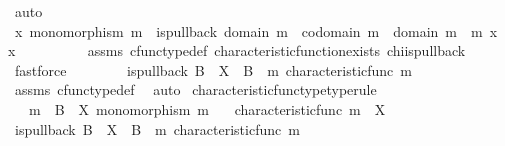 \begin{isabellebody}
\ auto\isanewline
\ \ \ \ \isamarkupfalse%
\ {\isachardoublequoteopen}{\isasymAnd}x{\isachardot}{\kern0pt}\ monomorphism\ m\ {\isasymlongrightarrow}\ is{\isacharunderscore}{\kern0pt}pullback\ {\isacharparenleft}{\kern0pt}domain\ m{\isacharparenright}{\kern0pt}\ {\isasymone}\ {\isacharparenleft}{\kern0pt}codomain\ m{\isacharparenright}{\kern0pt}\ {\isasymOmega}\ {\isacharparenleft}{\kern0pt}{\isasymbeta}\isactrlbsub domain\ m\isactrlesub {\isacharparenright}{\kern0pt}\ {\isasymt}\ m\ x\ {\isasymLongrightarrow}\ x\ {\isacharequal}{\kern0pt}\ {\isasymchi}{\isachardoublequoteclose}\isanewline
\ \ \ \ \ \ \isamarkupfalse%
\ assms\ cfunc{\isacharunderscore}{\kern0pt}type{\isacharunderscore}{\kern0pt}def\ characteristic{\isacharunderscore}{\kern0pt}function{\isacharunderscore}{\kern0pt}exists\ chi{\isacharunderscore}{\kern0pt}is{\isacharunderscore}{\kern0pt}pullback\ \isamarkupfalse%
\ fastforce\isanewline
\ \ \isamarkupfalse%
\isanewline
\ \ \isamarkupfalse%
\ \isamarkupfalse%
\ {\isachardoublequoteopen}is{\isacharunderscore}{\kern0pt}pullback\ B\ {\isasymone}\ X\ {\isasymOmega}\ {\isacharparenleft}{\kern0pt}{\isasymbeta}\isactrlbsub B\isactrlesub {\isacharparenright}{\kern0pt}\ {\isasymt}\ m\ {\isacharparenleft}{\kern0pt}characteristic{\isacharunderscore}{\kern0pt}func\ m{\isacharparenright}{\kern0pt}{\isachardoublequoteclose}\isanewline
\ \ \ \ \isamarkupfalse%
\ assms\ cfunc{\isacharunderscore}{\kern0pt}type{\isacharunderscore}{\kern0pt}def\ \isamarkupfalse%
\ auto\isanewline
{}\isamarkupfalse%
%
\endisatagproof
{\isafoldproof}%
%
\isadelimproof
\isanewline
%
\endisadelimproof
\isanewline
{}\isamarkupfalse%
\ characteristic{\isacharunderscore}{\kern0pt}func{\isacharunderscore}{\kern0pt}type{\isacharbrackleft}{\kern0pt}type{\isacharunderscore}{\kern0pt}rule{\isacharbrackright}{\kern0pt}{\isacharcolon}{\kern0pt}\isanewline
\ \ \ {\isachardoublequoteopen}m\ {\isacharcolon}{\kern0pt}\ B\ {\isasymrightarrow}\ X{\isachardoublequoteclose}\ {\isachardoublequoteopen}monomorphism\ m{\isachardoublequoteclose}\isanewline
\ \ \ {\isachardoublequoteopen}characteristic{\isacharunderscore}{\kern0pt}func\ m\ {\isacharcolon}{\kern0pt}\ X\ {\isasymrightarrow}\ {\isasymOmega}{\isachardoublequoteclose}\isanewline
%
\isadelimproof
%
\endisadelimproof
%
\isatagproof
{}\isamarkupfalse%
\ {\isacharminus}{\kern0pt}\isanewline
\ \ \isamarkupfalse%
\ {\isachardoublequoteopen}is{\isacharunderscore}{\kern0pt}pullback\ B\ {\isasymone}\ X\ {\isasymOmega}\ {\isacharparenleft}{\kern0pt}{\isasymbeta}\isactrlbsub B\isactrlesub {\isacharparenright}{\kern0pt}\ {\isasymt}\ m\ {\isacharparenleft}{\kern0pt}characteristic{\isacharunderscore}{\kern0pt}func\ m{\isacharparenright}{\kern0pt}{\isachardoublequoteclose}\isanewline

\end{isabellebody}
